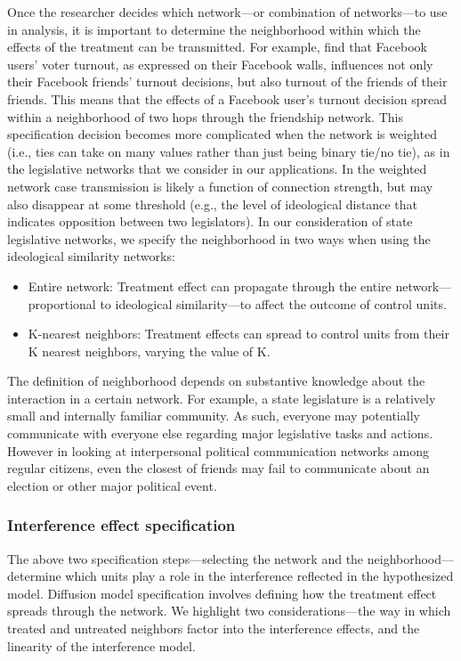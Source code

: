 \documentclass[12pt]{article}
\begin{document}
Once the researcher decides which network---or combination of networks---to use in analysis, it is important to determine the neighborhood within which the effects of the treatment can be transmitted. For example, \cite{Bond:2012} find that Facebook users' voter turnout, as expressed on their Facebook walls, influences not only their Facebook friends' turnout decisions, but also turnout of the friends of their friends. This means that the effects of a Facebook user's turnout decision spread within a neighborhood of two hops through the friendship network. This specification decision becomes more complicated when the network is weighted (i.e., ties can take on many values rather than just being binary tie/no tie), as in the legislative networks that we consider in our applications. In the weighted network case transmission is likely a function of connection strength, but may also disappear at some threshold (e.g., the level of ideological distance that indicates opposition between two legislators).  In our consideration of state legislative networks, we specify the neighborhood in two ways when using the ideological similarity networks:
\begin{itemize}
\item Entire network: Treatment effect can propagate through the entire network---proportional to ideological similarity---to affect the outcome of control units. 
\item K-nearest neighbors: Treatment effects can spread to control units from their K nearest neighbors, varying the value of K.
\end{itemize}

The definition of neighborhood depends on substantive knowledge about the interaction in a certain network. For example, a state legislature is a relatively small and internally familiar community. As such, everyone may potentially communicate with everyone else regarding major legislative tasks and actions. However in looking at interpersonal political communication networks among regular citizens, even the closest of friends may fail to communicate about an election or other major political event.


\subsubsection{Interference effect specification}
The above two specification steps---selecting the network and the neighborhood---determine which units play a role in the interference reflected in the hypothesized model. Diffusion model specification involves defining how the treatment effect spreads through the network. We highlight two considerations---the way in which treated and untreated neighbors factor into the interference effects, and the linearity of the interference model. 
\end{document}
